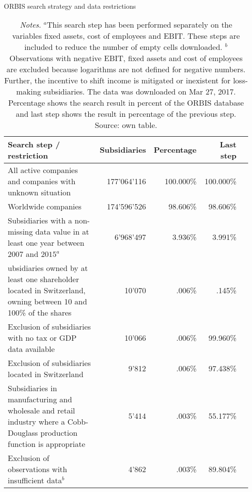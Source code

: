 \documentclass[10pt,twocolumn,oneside,cmyk]{article}
\begin{document}
\begin{table*}[t]
\footnotesize
 \begin{center}
  \caption{ORBIS search strategy and data restrictions}\label{tab1}
   \begin{tabularx}{\textwidth}{p{}r r r r}
\toprule
   Search step / restriction &Subsidiaries &Percentage &Last step\\
   \midrule
   All active companies and companies with unknown situation &177'064'116 &100.000\% &100.000\%\\
   Worldwide companies &174'596'526 &98.606\% &98.606\%\\
   Subsidiaries with a non-missing data value in at least one year between 2007 and $2015^a$ &6'968'497 &3.936\% &3.991\%\\
   ubsidiaries owned by at least one shareholder located in Switzerland, owning between 10 and 100\% of the shares &10'070 &.006\% &.145\%\\
   Exclusion of subsidiaries with no tax or GDP data available& 10'066 &.006\% &99.960\%\\
   Exclusion of subsidiaries located in Switzerland &9'812 &.006\% &97.438\%\\
   Subsidiaries in manufacturing and wholesale and retail industry where a Cobb-Douglass production function is appropriate &5'414 &.003\% &55.177\%\\
   Exclusion of observations with insufficient data$^b$ &4'862 &.003\% &89.804\%\\
\bottomrule
\end{tabularx}
\caption*{\footnotesize{\textit{Notes}. $^a$This search step has been performed separately on the variables fixed assets, cost of employees and EBIT. These steps are included to reduce the number of empty cells downloaded. $^b$Observations with negative EBIT, fixed assets and cost of employees are excluded because logarithms are not defined for negative numbers. Further, the incentive to shift income is mitigated or inexistent for loss-making subsidiaries. The data was downloaded on Mar 27, 2017. Percentage shows the search result in percent of the ORBIS database and last step shows the result in percentage of the previous step. Source: own table.}}
 \end{center}
\end{table*}
\end{document}
